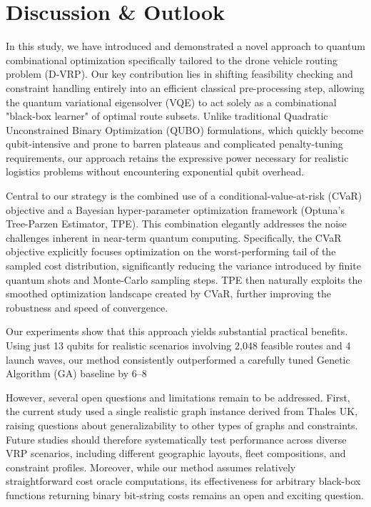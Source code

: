 \section{Discussion & Outlook}

In this study, we have introduced and demonstrated a novel approach to quantum combinational optimization specifically tailored to the drone vehicle routing problem (D-VRP). Our key contribution lies in shifting feasibility checking and constraint handling entirely into an efficient classical pre-processing step, allowing the quantum variational eigensolver (VQE) to act solely as a combinational "black-box learner" of optimal route subsets. Unlike traditional Quadratic Unconstrained Binary Optimization (QUBO) formulations, which quickly become qubit-intensive and prone to barren plateaus and complicated penalty-tuning requirements, our approach retains the expressive power necessary for realistic logistics problems without encountering exponential qubit overhead.

Central to our strategy is the combined use of a conditional-value-at-risk (CVaR) objective and a Bayesian hyper-parameter optimization framework (Optuna's Tree-Parzen Estimator, TPE). This combination elegantly addresses the noise challenges inherent in near-term quantum computing. Specifically, the CVaR objective explicitly focuses optimization on the worst-performing tail of the sampled cost distribution, significantly reducing the variance introduced by finite quantum shots and Monte-Carlo sampling steps. TPE then naturally exploits the smoothed optimization landscape created by CVaR, further improving the robustness and speed of convergence.

Our experiments show that this approach yields substantial practical benefits. Using just 13 qubits for realistic scenarios involving 2,048 feasible routes and 4 launch waves, our method consistently outperformed a carefully tuned Genetic Algorithm (GA) baseline by 6–8%

However, several open questions and limitations remain to be addressed. First, the current study used a single realistic graph instance derived from Thales UK, raising questions about generalizability to other types of graphs and constraints. Future studies should therefore systematically test performance across diverse VRP scenarios, including different geographic layouts, fleet compositions, and constraint profiles. Moreover, while our method assumes relatively straightforward cost oracle computations, its effectiveness for arbitrary black-box functions returning binary bit-string costs remains an open and exciting question.

